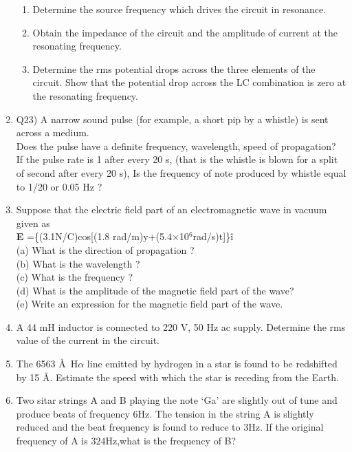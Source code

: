\begin{enumerate}[label=\thesection.\arabic*,ref=\thesection.\theenumi]
\begin{enumerate}
    \item Determine the source frequency which drives the circuit in resonance.
    \item Obtain the impedance of the circuit and the amplitude of current
at the resonating frequency.
    \item Determine the rms potential drops across the three elements of
the circuit. Show that the potential drop across the LC
combination is zero at the resonating frequency.\\
\end{enumerate}
\solution
\pagebreak

\item Q23) A narrow sound pulse (for example, a short pip by a whistle) is sent across a
	medium.\\  Does the pulse have a definite  frequency,  wavelength,  speed
	of propagation?\\[1ex] If the pulse rate is 1 after every 20 s, (that is the whistle is
	blown for a split of second after every 20 s), Is the frequency of note produced
	by whistle equal to 1/20 or 0.05 Hz ?\\
\solution
\pagebreak
\item Suppose that the electric field part of an electromagnetic wave in vacuum given as\\ \textbf{E} =\{(3.1N/C)cos[(1.8 rad/m)y+(5.4$\times$10$^{6}$rad/s)t]\}\^i \\
(a) What is the direction of propagation ?\\
(b) What is the wavelength ? \\
(c) What is the frequency ?\\
(d) What is the amplitude of the magnetic field part of the wave?\\
(e) Write an expression for the magnetic field part of the wave.\\
\solution
\pagebreak

\item A 44 mH inductor is connected to 220 V, 50 Hz ac supply. Determine
the rms value of the current in the circuit.\\
\solution
\pagebreak

\item The 6563 \AA\, H$\alpha$ line emitted by hydrogen in a star is found to be redshifted by 15 \AA. Estimate the speed with which the star is receding from the Earth.
\solution
\pagebreak

\item Two sitar strings A and B playing the note ‘Ga’ are slightly out of tune and produce beats of frequency $6$Hz. The tension in the string A is slightly reduced and the beat frequency is found to reduce to $3$Hz. If the original frequency of A is $324$Hz,what is the frequency of B?\\
\solution
\pagebreak


\end{enumerate}
